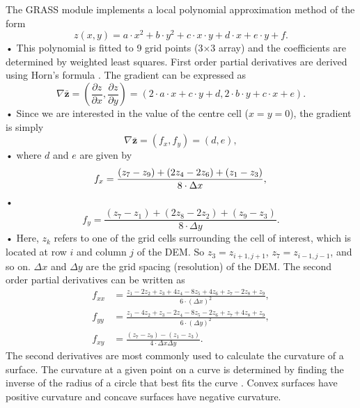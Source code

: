\documentclass[12pt]{article}
\begin{document}
The GRASS module implements a local polynomial approximation method of the form 
\begin{equation}
z(x,y) = a\cdot x^2 +b\cdot y^2 +c \cdot x\cdot y +d \cdot x + e\cdot y +f.
\end{equation}•
This polynomial is fitted to 9 grid points (3$\times$3 array) and the coefficients are determined by weighted least squares. 
First order partial derivatives are derived using Horn's formula \citep{Horn1981, Neteler2013}. The gradient can be expressed as
\begin{equation}
\nabla \bar{ \bm{z}} = \left( \frac{\partial z}{\partial x}, \frac{\partial z}{\partial y} \right) = \left( 2 \cdot a  \cdot x + c  \cdot y +d, 2 \cdot b  \cdot y + c  \cdot x + e \right) .
\end{equation}•
Since we are interested in the value of the centre cell ($x=y=0$), the gradient is simply 
\begin{equation}
\nabla \bar{ \bm{z}} = (f_x,f_y) = (d,e),
\end{equation}•
where $d$ and $e$ are given by
\begin{equation}
f_x = \frac{(z_7-z_9)+(2z_4-2z_6)+(z_1-z_3)}{8 \cdot \Delta x},\\
\end{equation}•
\begin{equation}
f_y = \frac{(z_7-z_1)+(2z_8-2z_2)+(z_9-z_3)}{8 \cdot \Delta y}.
\end{equation}•
Here, $z_k$ refers to one of the grid cells surrounding the cell of interest, which is located at row $i$ and column $j$ of the DEM. So $z_3 = z_{i+1,j+1}$, $z_7 = z_{i-1,j-1}$, and so on. $\Delta x$ and $\Delta y$ are the grid spacing (resolution) of the DEM. The second order partial derivatives can be written as \citep{Hofierka2009, Neteler2013}
\begin{align}
f_{xx} &= \frac{z_1-2z_2+z_3+4z_4-8z_5+4z_6+z_7-2z_8+z_9}{6 \cdot (\Delta x)^2},\\
f_{yy} &= \frac{z_1-4z_2+z_3-2z_4-8z_5-2z_6+z_7+4z_8+z_9}{6 \cdot (\Delta y)^2},\\
f_{xy} &= \frac{(z_7-z_9)-(z_1-z_3)}{4 \cdot \Delta x \Delta y}.
\end{align}
The second derivatives are most commonly used to calculate the curvature of a surface. The curvature at a given point on a curve is determined by finding the inverse of the radius of a circle that best fits the curve \citep{Olaya2009}. Convex surfaces have positive curvature and concave surfaces have negative curvature. 
\end{document}
